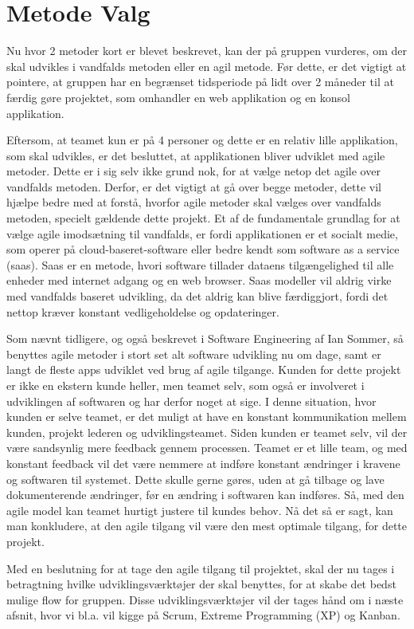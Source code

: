 \section{Metode Valg}

Nu hvor 2 metoder kort er blevet beskrevet, kan der på gruppen vurderes, om der skal udvikles i vandfalds metoden eller en agil metode. Før dette, er det vigtigt at pointere, at gruppen har en begrænset tidsperiode på lidt over 2 måneder til at færdig gøre projektet, som omhandler en web applikation og en konsol applikation. 

Eftersom, at teamet kun er på 4 personer og dette er en relativ lille applikation, som skal udvikles, er det besluttet, at applikationen bliver udviklet med agile metoder. Dette er i sig selv ikke grund nok, for at vælge netop det agile over vandfalds metoden. Derfor, er det vigtigt at gå over begge metoder, dette vil hjælpe bedre med at forstå, hvorfor agile metoder skal vælges over vandfalds metoden, specielt gældende dette projekt. Et af de fundamentale grundlag for at vælge agile imodsætning til vandfalds, er fordi applikationen er et socialt medie, som operer på cloud-baseret-software eller bedre kendt som software as a service (saas). Saas er en metode, hvori software tillader dataens tilgængelighed til alle enheder med internet adgang og en web browser.\cite{SoftwareAdvice} Saas modeller vil aldrig virke med vandfalds baseret udvikling, da det aldrig kan blive færdiggjort, fordi det nettop kræver konstant vedligeholdelse og opdateringer. 

Som nævnt tidligere, og også beskrevet i Software Engineering af Ian Sommer, så benyttes agile metoder i stort set alt software udvikling nu om dage, samt er langt de fleste apps udviklet ved brug af agile tilgange. \cite{Sommerville} Kunden for dette projekt er ikke en ekstern kunde heller, men teamet selv, som også er involveret i udviklingen af softwaren og har derfor noget at sige. I denne situation, hvor kunden er selve teamet, er det muligt at have en konstant kommunikation mellem kunden, projekt lederen og udviklingsteamet. Siden kunden er teamet selv, vil der være sandsynlig mere feedback gennem processen. Teamet er et lille team, og med konstant feedback vil det være nemmere at indføre konstant ændringer i kravene og softwaren til systemet. Dette skulle gerne gøres, uden at gå tilbage og lave dokumenterende ændringer, før en ændring i softwaren kan indføres. Så, med den agile model kan teamet hurtigt justere til kundes behov. Nå det så er sagt, kan man konkludere, at den agile tilgang vil være den mest optimale tilgang, for dette projekt. 

Med en beslutning for at tage den agile tilgang til projektet, skal der nu tages i betragtning hvilke udviklingsværktøjer der skal benyttes, for at skabe det bedst mulige flow for gruppen. Disse udviklingsværktøjer vil der tages hånd om i næste afsnit, hvor vi bl.a. vil kigge på Scrum, Extreme Programming (XP) og Kanban. 



